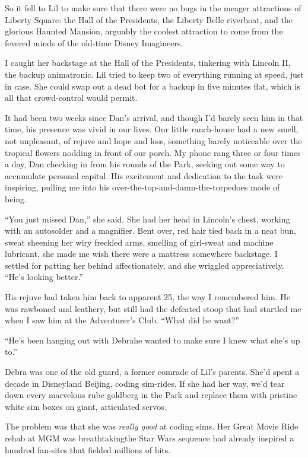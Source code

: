 So it fell to Lil to make sure that there were no bugs in the
meager attractions of Liberty Square: the Hall of the Presidents,
the Liberty Belle riverboat, and the glorious Haunted Mansion,
arguably the coolest attraction to come from the fevered minds of
the old-time Disney Imagineers.

I caught her backstage at the Hall of the Presidents, tinkering
with Lincoln II, the backup animatronic. Lil tried to keep two of
everything running at speed, just in case. She could swap out a
dead bot for a backup in five minutes flat, which is all that
crowd-control would permit.

It had been two weeks since Dan's arrival, and though I'd barely
seen him in that time, his presence was vivid in our lives. Our
little ranch-house had a new smell, not unpleasant, of rejuve and
hope and loss, something barely noticeable over the tropical
flowers nodding in front of our porch. My phone rang three or four
times a day, Dan checking in from his rounds of the Park, seeking
out some way to accumulate personal capital. His excitement and
dedication to the task were inspiring, pulling me into his
over-the-top-and-damn-the-torpedoes mode of being.

“You just missed Dan,” she said. She had her head in Lincoln's
chest, working with an autosolder and a magnifier. Bent over, red
hair tied back in a neat bun, sweat sheening her wiry freckled
arms, smelling of girl-sweat and machine lubricant, she made me
wish there were a mattress somewhere backstage. I settled for
patting her behind affectionately, and she wriggled appreciatively.
“He's looking better.”

His rejuve had taken him back to apparent 25, the way I remembered
him. He was rawboned and leathery, but still had the defeated stoop
that had startled me when I saw him at the Adventurer's Club. “What
did he want?”

“He's been hanging out with Debra{\dash}he wanted to make sure I knew
what she's up to.”

Debra was one of the old guard, a former comrade of Lil's parents.
She'd spent a decade in Disneyland Beijing, coding sim-rides. If
she had her way, we'd tear down every marvelous rube goldberg in
the Park and replace them with pristine white sim boxes on giant,
articulated servos.

The problem was that she was \emph{really good} at coding sims. Her
Great Movie Ride rehab at MGM was breathtaking{\dash}the Star Wars
sequence had already inspired a hundred fan-sites that fielded
millions of hits.


